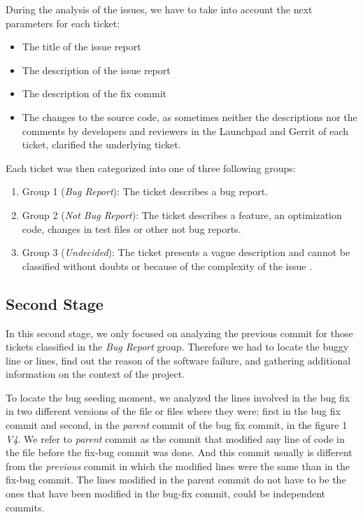 \documentclass[ifip]{svmult}
\begin{document}
During the analysis of the issues, we have to take into account the next parameters for each ticket:

\begin{itemize}
  \item The title of the issue report
  \item The description of the issue report
  \item The description of the fix commit
  \item The changes to the source code, as sometimes neither the descriptions nor the comments by developers and reviewers in the Launchpad and Gerrit of each ticket, clarified the underlying ticket.
\end{itemize}

Each ticket was then categorized into one of three following groups:

\begin{enumerate}
  \item Group 1 (\textit{Bug Report}): The ticket describes a bug report.
  \item Group 2 (\textit{Not Bug Report}): The ticket describes a feature, an optimization code, changes in test files or other not bug reports.
  \item Group 3 (\textit{Undecided}): The ticket presents a vague description and cannot be classified without doubts or because of the complexity of the issue .
\end{enumerate}

\subsection{Second Stage}
\label{subsec:second}
In this second stage, we only focused on analyzing the previous commit for those tickets classified in the \textit{Bug Report} group. Therefore we had to locate the buggy line or lines, find out the reason of the software failure, and gathering additional information on the context of the project.

To locate the bug seeding moment, we analyzed the lines involved in the bug fix in two different versions of the file or files where they were; first in the bug fix commit and second, in the \emph{parent} commit of the bug fix commit, in the figure 1 \textit{V4}. We refer to \emph{parent} commit as the commit that modified any line of code in the file before the fix-bug commit was done. And this commit usually is different from the \emph{previous} commit in which the modified lines were the same than in the fix-bug commit. The lines modified in the parent commit do not have to be the ones that have been modified in the bug-fix commit, could be independent commits.
\end{document}
